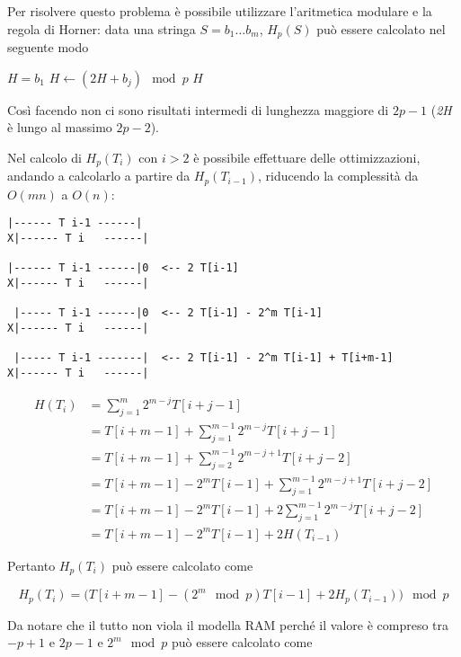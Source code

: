 Per risolvere questo problema è possibile utilizzare l'aritmetica
modulare e la regola di Horner: data una stringa $S = b_1 \ldots b_m$, $H_p(S)$ può essere calcolato nel seguente modo

\begin{breakablealgorithm}
	\begin{algorithmic}[1]
    \State $ H = b_1 $
        \State $H \gets (2H + b_j) \mod p$
    \EndFor
    \State \Return $H$
\EndFunction
\end{algorithmic}
\end{breakablealgorithm}


Così facendo non ci sono risultati intermedi di lunghezza maggiore di
$2p-1$ (\emph{2H} è lungo al massimo $2p-2$).

Nel calcolo di $H_p(T_i)$ con $i > 2$ è possibile effettuare delle ottimizzazioni, andando a calcolarlo a
partire da $H_p(T_{i-1})$, riducendo la complessità da
$O(mn)$ a $O(n)$:

\begin{verbatim}
|------ T i-1 ------|
X|------ T i   ------|

|------ T i-1 ------|0  <-- 2 T[i-1]
X|------ T i   ------|

 |----- T i-1 ------|0  <-- 2 T[i-1] - 2^m T[i-1]
X|------ T i   ------|

 |----- T i-1 -------|  <-- 2 T[i-1] - 2^m T[i-1] + T[i+m-1]
X|------ T i   ------| 
\end{verbatim}

\begin{align*}
	H(T_i) &= \sum\limits_{j=1}^m 2^{m-j} T[i+j -1] \\
	           &= T[i+m -1] + \sum\limits_{j=1}^{m-1} 2^{m-j} T[i+j -1] \\
	           &= T[i+m -1] + \sum\limits_{j=2}^{m-1} 2^{m-j+1} T[i+j -2] \\
	           &= T[i+m -1] - 2^m T[i-1] + \sum\limits_{j=1}^{m-1} 2^{m-j+1} T[i+j -2] \\
	           &= T[i+m -1] - 2^m T[i-1] + 2\sum\limits_{j=1}^{m-1} 2^{m-j} T[i+j -2] \\
	           &= T[i+m -1] - 2^m T[i-1] + 2H(T_{i-1})
\end{align*}

Pertanto $ H_p(T_i) $ può essere calcolato come

$$
H_p(T_i) = \big( T[i+m -1] - (2^m \mod p) T[i-1] + 2H_p(T_{i-1}) \big) \mod p
$$

Da notare che il tutto non viola il modella RAM perché il valore è compreso tra $ -p+1 $ e $ 2p-1 $ e $ 2^m \mod p $ può essere calcolato come

